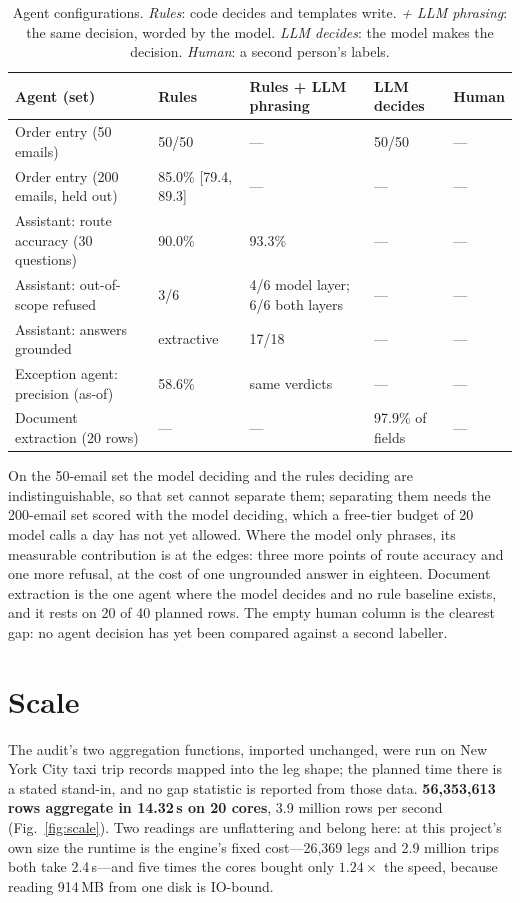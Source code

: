 \documentclass[conference]{IEEEtran}
\begin{document}
\begin{table}[t]
\caption{Agent configurations. \textit{Rules}: code decides and templates write. \textit{+ LLM phrasing}: the same decision, worded by the model. \textit{LLM decides}: the model makes the decision. \textit{Human}: a second person's labels.}
\label{tab:ablation}
\centering
\begin{tabular}{@{}lllll@{}}
\toprule
Agent (set) & Rules & Rules + LLM phrasing & LLM decides & Human \\
\midrule
Order entry (50 emails) & 50/50 & --- & 50/50 & --- \\
Order entry (200 emails, held out) & 85.0\% [79.4, 89.3] & --- & --- & --- \\
Assistant: route accuracy (30 questions) & 90.0\% & 93.3\% & --- & --- \\
Assistant: out-of-scope refused & 3/6 & 4/6 model layer; 6/6 both layers & --- & --- \\
Assistant: answers grounded & extractive & 17/18 & --- & --- \\
Exception agent: precision (as-of) & 58.6\% & same verdicts & --- & --- \\
Document extraction (20 rows) & --- & --- & 97.9\% of fields & --- \\
\bottomrule
\end{tabular}
\end{table}

On the 50-email set the model deciding and the rules deciding are indistinguishable, so that set cannot separate them; separating them needs the 200-email set scored with the model deciding, which a free-tier budget of 20 model calls a day has not yet allowed. Where the model only phrases, its measurable contribution is at the edges: three more points of route accuracy and one more refusal, at the cost of one ungrounded answer in eighteen. Document extraction is the one agent where the model decides and no rule baseline exists, and it rests on 20 of 40 planned rows. The empty human column is the clearest gap: no agent decision has yet been compared against a second labeller.

\section{Scale}

The audit's two aggregation functions, imported unchanged, were run on New York City taxi trip records mapped into the leg shape; the planned time there is a stated stand-in, and no gap statistic is reported from those data. \textbf{56,353,613 rows aggregate in 14.32\,s on 20 cores}, 3.9 million rows per second (Fig.~\ref{fig:scale}). Two readings are unflattering and belong here: at this project's own size the runtime is the engine's fixed cost---26,369 legs and 2.9 million trips both take 2.4\,s---and five times the cores bought only $1.24\times$ the speed, because reading 914\,MB from one disk is IO-bound.
\end{document}
